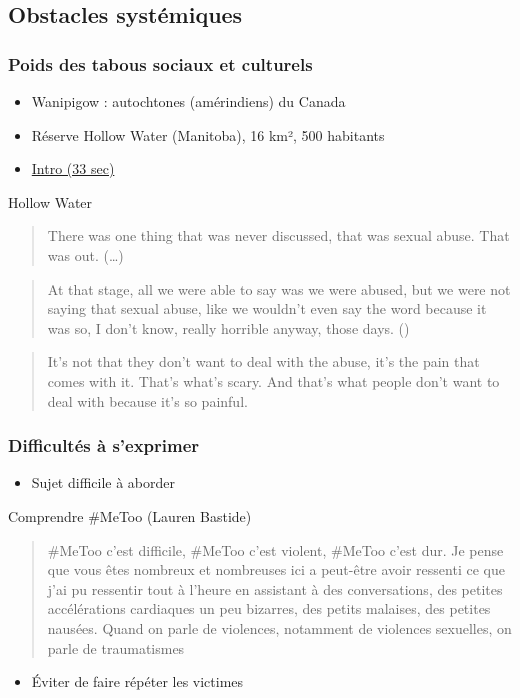 \documentclass[french]{beamer}
\begin{document}
\subsection{Obstacles systémiques}
\begin{frame}
  \frametitle{Poids des tabous sociaux et culturels}
  \begin{itemize}
    \item Wanipigow : autochtones (amérindiens) du Canada
    \item Réserve Hollow Water (Manitoba), 16 km², 500 habitants
    \item \href{https://www.nfb.ca/film/hollow_water/}{Intro (33 sec)}
  \end{itemize}
  \begin{block}{Hollow Water}
    \begin{quote}
      There was one thing that was never discussed, that was sexual abuse.
      That was out. 
      (…)
    \end{quote}
    \begin{quote}
      At that stage, all we were able to say was we were abused, but we were not saying that sexual abuse, like we wouldn’t even say the word because it was so, I don’t know, really horrible anyway, those days.
      ()
    \end{quote}
    \begin{quote}
It’s not that they don’t want to deal with the abuse,
it’s the pain that comes with it.
That’s what’s scary.
And that’s what people don’t want to deal with
because it’s so painful.
    \end{quote}
  \end{block}
\end{frame}

\begin{frame}
  \frametitle{Difficultés à s’exprimer}
  \begin{itemize}
    \item Sujet difficile à aborder
  \end{itemize}
  \begin{block}{Comprendre \#MeToo (Lauren Bastide)}
    \begin{quote}
      \#MeToo c’est difficile, \#MeToo c’est violent, \#MeToo c’est dur. Je pense que vous êtes nombreux et nombreuses ici a peut-être avoir ressenti ce que j’ai pu ressentir tout à l’heure en assistant à des conversations, des petites accélérations cardiaques un peu bizarres, des petits malaises, des petites nausées. Quand on parle de violences, notamment de violences sexuelles, on parle de traumatismes
    \end{quote}
  \end{block}
  \begin{itemize}
    \item Éviter de faire répéter les victimes
  \end{itemize}
\end{frame}
\end{document}

